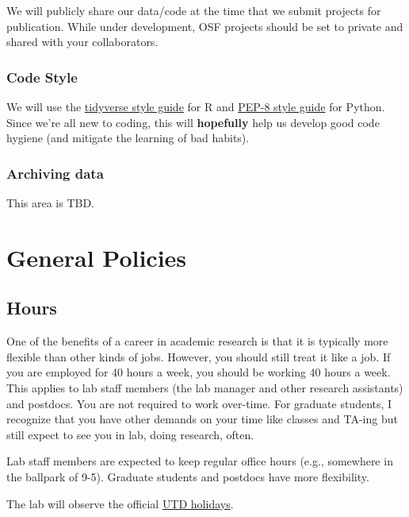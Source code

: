 \documentclass[
]{book}
\begin{document}
We will publicly share our data/code at the time that we submit projects for publication. While under development, OSF projects should be set to private and shared with your collaborators.

\hypertarget{code-style}{%
\subsection{Code Style}\label{code-style}}

We will use the \href{https://style.tidyverse.org/}{tidyverse style guide} for R and \href{https://www.python.org/dev/peps/pep-0008/}{PEP-8 style guide} for Python. Since we're all new to coding, this will \textbf{hopefully} help us develop good code hygiene (and mitigate the learning of bad habits).

\hypertarget{archiving-data}{%
\subsection{Archiving data}\label{archiving-data}}

This area is TBD.

\hypertarget{general-policies}{%
\chapter{General Policies}\label{general-policies}}

\hypertarget{hours}{%
\section{Hours}\label{hours}}

One of the benefits of a career in academic research is that it is typically more flexible than other kinds of jobs. However, you should still treat it like a job. If you are employed for 40 hours a week, you should be working 40 hours a week. This applies to lab staff members (the lab manager and other research assistants) and postdocs. You are not required to work over-time. For graduate students, I recognize that you have other demands on your time like classes and TA-ing but still expect to see you in lab, doing research, often.

Lab staff members are expected to keep regular office hours (e.g., somewhere in the ballpark of 9-5). Graduate students and postdocs have more flexibility.

The lab will observe the official \href{https://www.utdallas.edu/hr/news/holidays/}{UTD holidays}.
\end{document}
